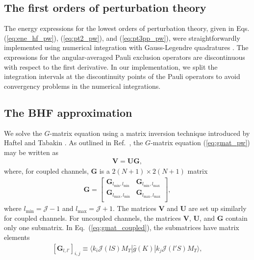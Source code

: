 \documentclass[a4paper,12pt]{report}
\begin{document}
\subsection{The first orders of perturbation theory}

The energy expressions for the lowest orders of perturbation theory, given in Eqs. (\ref{eq:ene_hf_pw}), (\ref{eq:pt2_pw}), and (\ref{eq:pt3pp_pw}), were straightforwardly implemented using numerical integration with Gauss-Legendre quadratures \cite{num_recipes}. The expressions for the angular-averaged Pauli exclusion operators are discontinuous with respect to the first derivative. In our implementation, we split the integration intervals at the discontinuity points of the Pauli operators to avoid convergency problems in the numerical integrations.  

\subsection{The BHF approximation}
 We solve the $G$-matrix equation using 
a matrix inversion technique introduced by Haftel and Tabakin 
\cite{haftel_tabakin}. As outlined in 
Ref.~\cite{haftel_tabakin}, the $G$-matrix equation 
(\ref{eq:gmat_pw}) may be written as 
\begin{align}
  \mathbf{V} = \mathbf{U}\mathbf{G},
\end{align} 
where, for coupled channels, $\mathbf{G}$ is a $2(N+1) \times 2(N+1)$ matrix
\begin{align}
  \mathbf{G} = \left[ \begin{array}{cc}
      \mathbf{G}_{l_{\text{min}}, l_{\text{min}}} & \mathbf{G}_{l_{\text{min}}, l_{\text{max}}} \\
      \mathbf{G}_{l_{\text{max}}, l_{\text{min}}} & \mathbf{G}_{l_{\text{max}}, l_{\text{max}}} \\
    \end{array} \right] , 
  \label{eq:gmat_coupled}
\end{align}
where $l_{\text{min}} = \mathcal{J}-1$ and 
$l_{\text{max}} = \mathcal{J}+1$. The matrices $\mathbf{V}$ 
and $\mathbf{U}$ are set up similarly for coupled channels. 
For uncoupled channels, the matrices $\mathbf{V}$, 
$\mathbf{U}$, and $\mathbf{G}$ contain only one submatrix. 
In Eq.~(\ref{eq:gmat_coupled}), the submatrices have matrix 
elements
\begin{align}
  \left[ \mathbf{G}_{l, l'}\right]_{i, j} \equiv \langle k_{i}\mathcal{J}(lS)M_{T}|\hat{g}(K)|k_{j}\mathcal{J}(l'S)M_{T}\rangle ,
  \label{eq:submat_g}
\end{align}
\end{document}
